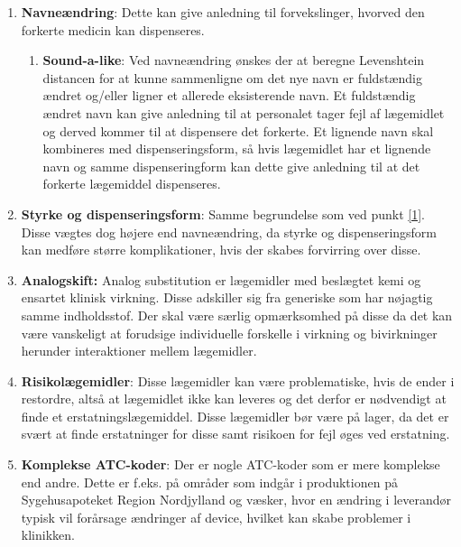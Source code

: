 \begin{enumerate}
\item \label{1} \textbf{Navneændring}: Dette kan give anledning til forvekslinger, hvorved den forkerte medicin kan dispenseres.
\begin{enumerate}
\item \textbf{Sound-a-like}: Ved navneændring ønskes der at beregne Levenshtein distancen for at kunne sammenligne om det nye navn er fuldstændig ændret og/eller ligner et allerede eksisterende navn. Et fuldstændig ændret navn kan give anledning til at personalet tager fejl af lægemidlet og derved kommer til at dispensere det forkerte. Et lignende navn skal kombineres med dispenseringsform, så hvis lægemidlet har et lignende navn og samme dispenseringform kan dette give anledning til at det forkerte lægemiddel dispenseres.
\end{enumerate} \vspace{2mm}
\item \textbf{Styrke og  dispenseringsform}: Samme begrundelse som ved punkt \ref{1}. Disse vægtes dog højere end navneændring, da styrke og dispenseringsform kan medføre større komplikationer, hvis der skabes forvirring over disse. \vspace{2mm}
\item \textbf{Analogskift:} Analog substitution er lægemidler med beslægtet kemi og ensartet klinisk virkning. Disse adskiller sig fra generiske som har nøjagtig samme indholdsstof. Der skal være særlig opmærksomhed på disse da det kan være vanskeligt at forudsige individuelle forskelle i virkning og bivirkninger herunder interaktioner mellem lægemidler. \vspace{2mm}
\item \textbf{Risikolægemidler}: Disse lægemidler kan være problematiske, hvis de ender i restordre, altså at lægemidlet ikke kan leveres og det derfor er nødvendigt at finde et erstatningslægemiddel. Disse lægemidler bør være på lager, da det er svært at finde erstatninger for disse samt risikoen for fejl øges ved erstatning.
\vspace{2mm}
\item \textbf{Komplekse ATC-koder}: Der er nogle ATC-koder som er mere komplekse end andre. Dette er f.eks. på områder som indgår i produktionen på Sygehusapoteket Region Nordjylland og væsker, hvor en ændring i leverandør typisk vil forårsage ændringer af device, hvilket kan skabe problemer i klinikken. 

\end{enumerate}
